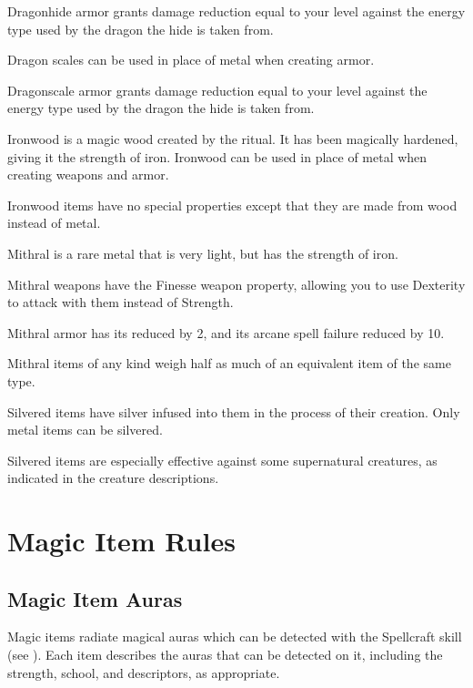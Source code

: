         Dragonhide armor grants damage reduction equal to your level against the energy type used by the dragon the hide is taken from.


        Dragon scales can be used in place of metal when creating armor.

        Dragonscale armor grants damage reduction equal to your level against the energy type used by the dragon the hide is taken from.

        Ironwood is a magic wood created by the  ritual.
        It has been magically hardened, giving it the strength of iron.
        Ironwood can be used in place of metal when creating weapons and armor.

        Ironwood items have no special properties except that they are made from wood instead of metal.

        Mithral is a rare metal that is very light, but has the strength of iron.

        Mithral weapons have the Finesse weapon property, allowing you to use Dexterity to attack with them instead of Strength.

        Mithral armor has its  reduced by 2, and its arcane spell failure reduced by 10.

        Mithral items of any kind weigh half as much of an equivalent item of the same type.


        Silvered items have silver infused into them in the process of their creation.
        Only metal items can be silvered.

        Silvered items are especially effective against some supernatural creatures, as indicated in the creature descriptions.

\section{Magic Item Rules}

    \subsection{Magic Item Auras}

        Magic items radiate magical auras which can be detected with the Spellcraft skill (see ).
        Each item describes the auras that can be detected on it, including the strength, school, and descriptors, as appropriate.

